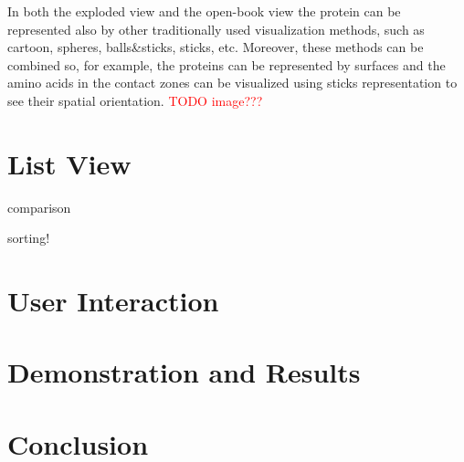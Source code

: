 \documentclass[journal]{vgtc}                %
\begin{document}
In both the exploded view and the open-book view the protein can be represented also by other traditionally used visualization methods, such as cartoon, spheres, balls\&sticks, sticks, etc.
Moreover, these methods can be combined so, for example, the proteins can be represented by surfaces and the amino acids in the contact zones can be visualized using sticks representation to see their spatial orientation. \textcolor{red}{TODO image???}

\section{List View}
comparison

sorting!

\section{User Interaction}

\section{Demonstration and Results}

\section{Conclusion}


%

%
%
%

\end{document}
